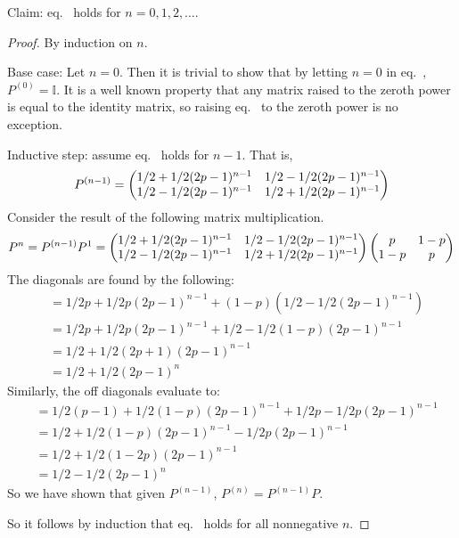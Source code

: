 \documentclass{article}
\begin{document}
    \begin{solution}
        Claim: eq.~ holds for $n = 0, 1, 2, \ldots$.
        \begin{proof}
            By induction on $n$.

            Base case: Let $n = 0$. Then it is trivial to show that by letting $n = 0$ in eq.~, $P^{(0)} = \mathbb{I}$. It is a well known property that any matrix raised to the zeroth power is equal to the identity matrix, so raising eq.~ to the zeroth power is no exception.

            Inductive step: assume eq.~ holds for $n - 1$. That is,
            \begin{equation*}
                P^{(n-1)} = \begin{pmatrix} 1/2 + 1/2(2p - 1)^{n-1} & 1/2 - 1/2(2p - 1)^{n-1} \\ 1/2 - 1/2(2p - 1)^{n-1} & 1/2 + 1/2(2p - 1)^{n-1} \end{pmatrix}
            \end{equation*}
            Consider the result of the following matrix multiplication. 
            \begin{equation*}
                P^n = P^{(n-1)}P^1 =  \begin{pmatrix} 1/2 + 1/2(2p - 1)^{n-1} & 1/2 - 1/2(2p - 1)^{n-1} \\ 1/2 - 1/2(2p - 1)^{n-1} & 1/2 + 1/2(2p - 1)^{n-1} \end{pmatrix} \begin{pmatrix} p & 1 - p \\ 1 - p & p \end{pmatrix}
            \end{equation*}
            The diagonals are found by the following:
            \begin{align*}
                &= 1/2p + 1/2p(2p-1)^{n-1} + (1-p)(1/2 - 1/2(2p-1)^{n-1}) \\
                &= 1/2p + 1/2p(2p - 1)^{n-1} + 1/2 - 1/2(1-p)(2p-1)^{n-1} \\
                &=  1/2 + 1/2(2p+1)(2p-1)^{n-1} \\
                &= 1/2 + 1/2(2p - 1)^n
            \end{align*}
            Similarly, the off diagonals evaluate to:
            \begin{align*}
                &= 1/2(p-1) + 1/2(1-p)(2p-1)^{n-1} + 1/2p - 1/2p(2p-1)^{n-1} \\
                &= 1/2 + 1/2(1-p)(2p-1)^{n-1} - 1/2p(2p-1)^{n-1} \\
                &= 1/2 + 1/2(1 - 2p)(2p-1)^{n-1} \\
                &= 1/2 - 1/2(2p-1)^{n}
            \end{align*}
            So we have shown that given $P^{(n-1)}$, $P^{(n)} = P^{(n-1)}P$.

            So it follows by induction that eq.~ holds for all nonnegative $n$.
        \end{proof}
    \end{solution}
\end{document}
